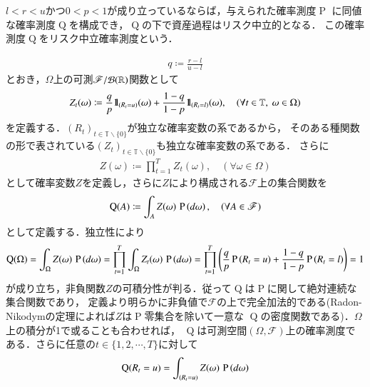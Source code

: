 \begin{prp}[リスク中立確率測度]
	$l < r < u$かつ$0 < p < 1$が成り立っているならば，与えられた確率測度$\operatorname{P}$
	に同値な確率測度$\operatorname{Q}$を構成でき，$\operatorname{Q}$の下で資産過程はリスク中立的となる．
	この確率測度$\operatorname{Q}$をリスク中立確率測度という．
\end{prp}

\begin{prf}
	\begin{align}
		q \coloneqq \frac{r - l}{u - l}
	\end{align}
	とおき，$\Omega$上の可測$\mathscr{F}/\mathcal{B}(\mathbb{R})$関数として
	\begin{align}
		Z_t(\omega) \coloneqq \frac{q}{p}\mbox{1}\hspace{-0.25em}\mbox{l}_{(R_t = u)}(\omega) + \frac{1-q}{1-p}\mbox{1}\hspace{-0.25em}\mbox{l}_{(R_t = l)}(\omega), 
		\quad (\forall t \in \mathbb{T},\ \omega \in \Omega) 
	\end{align}
	を定義する．$(R_t)_{t \in \mathbb{T}\backslash \{0\}}$が独立な確率変数の系であるから，
	そのある種関数の形で表されている$(Z_t)_{t \in \mathbb{T}\backslash \{0\}}$も独立な確率変数の系である．
	さらに
	\begin{align}
		Z(\omega) \coloneqq \prod_{t = 1}^{T} Z_t(\omega),\quad (\forall \omega \in \Omega)
	\end{align}
	として確率変数$Z$を定義し，さらに$Z$により構成される$\mathscr{F}$上の集合関数を
	\begin{align}
		\operatorname{Q}(A) \coloneqq \int_{A} Z(\omega)\, \operatorname{P} \left(d\omega\right), \quad (\forall A \in \mathscr{F})
	\end{align}
	として定義する．独立性により
	\begin{align}
		\operatorname{Q}(\Omega) = \int_{\Omega} Z(\omega)\, \operatorname{P} \left(d\omega\right)
		= \prod_{t=1}^{T} \int_{\Omega} Z_t(\omega)\, \operatorname{P} \left(d\omega\right)
		= \prod_{t=1}^{T} \left( \frac{q}{p}\operatorname{P} \left(R_t = u\right) + \frac{1-q}{1-p}\operatorname{P} \left(R_t = l\right) \right)
		= 1
	\end{align}
	が成り立ち，非負関数$Z$の可積分性が判る．従って$\operatorname{Q}$は$\operatorname{P}$に関して絶対連続な集合関数であり，
	定義より明らかに非負値で$\mathscr{F}$の上で完全加法的である(Radon-Nikodymの定理によれば$Z$は$\operatorname{P}$零集合を除いて一意な
	$\operatorname{Q}$の密度関数である)．$\Omega$上の積分が1で或ることも合わせれば，
	$\operatorname{Q}$は可測空間$(\Omega, \mathscr{F})$上の確率測度である．さらに任意の$t \in \{1,2,\cdots,T\}$に対して
	\begin{align}
		\operatorname{Q}(R_t = u) &= \int_{(R_t=u)} Z(\omega)\, \prob{d\omega} \\

\end{align}
\end{prf}
